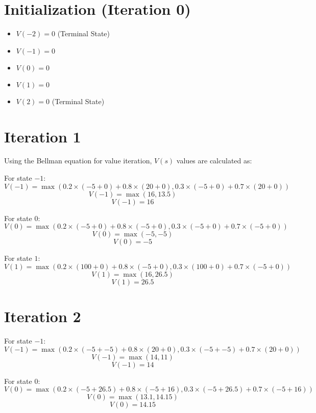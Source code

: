 \begin{answer}
  
  \section*{Initialization (Iteration 0)}
  
  \begin{itemize}
      \item $V(-2) = 0$ (Terminal State)
      \item $V(-1) = 0$
      \item $V(0) = 0$
      \item $V(1) = 0$
      \item $V(2) = 0$ (Terminal State)
  \end{itemize}
  
  \section*{Iteration 1}
  
  Using the Bellman equation for value iteration, $V(s)$ values are calculated as:
  
  For state $-1$:
  \[
  V(-1) = \max\left(0.2 \times (-5 + 0) + 0.8 \times (20 + 0), 0.3 \times (-5 + 0) + 0.7 \times (20 + 0)\right)
  \]
  \[
  V(-1) = \max(16, 13.5)
  \]
  \[
  V(-1) = 16
  \]
  
  For state $0$:
  \[
  V(0) = \max\left(0.2 \times (-5 + 0) + 0.8 \times (-5 + 0), 0.3 \times (-5 + 0) + 0.7 \times (-5 + 0)\right)
  \]
  \[
  V(0) = \max(-5, -5)
  \]
  \[
  V(0) = -5
  \]
  
  For state $1$:
  \[
  V(1) = \max\left(0.2 \times (100 + 0) + 0.8 \times (-5 + 0), 0.3 \times (100 + 0) + 0.7 \times (-5 + 0)\right)
  \]
  \[
  V(1) = \max(16, 26.5)
  \]
  \[
  V(1) = 26.5
  \]
  
  \section*{Iteration 2}
  
  For state $-1$:
  \[
  V(-1) = \max\left(0.2 \times (-5 + -5) + 0.8 \times (20 + 0), 0.3 \times (-5 + -5) + 0.7 \times (20 + 0)\right)
  \]
  \[
  V(-1) = \max(14, 11)
  \]
  \[
  V(-1) = 14
  \]
  
  For state $0$:
  \[
  V(0) = \max\left(0.2 \times (-5 + 26.5) + 0.8 \times (-5 + 16), 0.3 \times (-5 + 26.5) + 0.7 \times (-5 + 16)\right)
  \]
  \[
  V(0) = \max(13.1, 14.15)
  \]
  \[
  V(0) = 14.15
  \]
  

\end{answer}
